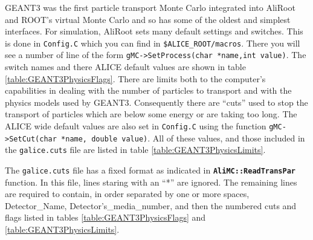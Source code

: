 GEANT3 was the first particle transport Monte Carlo integrated into
AliRoot and ROOT's virtual Monte Carlo and so has some of the
oldest and simplest interfaces. For simulation, AliRoot sets many
default settings and switches. This is done in \texttt{Config.C} which
you can find in \texttt{\$ALICE\_ROOT/macros}. There you will see a
number of line of the form \texttt{gMC->SetProcess(char *name,int value)}.
The switch names and there ALICE default values are shown in table
\ref{table:GEANT3PhysicsFlags}. There are limits both to the computer's
capabilities in dealing with the number of particles to transport and
with the physics models used by GEANT3. Consequently there are ``cuts''
used to stop the transport of particles which are below some energy
or are taking too long. The ALICE wide default values are also set
in \texttt{Config.C} using the function \texttt{gMC->SetCut(char *name,
double value)}. All of these values, and those included in the 
\texttt{galice.cuts} file are listed in table \ref{table:GEANT3PhysicsLimits}.

The \texttt{galice.cuts} file has a fixed format as indicated in
\texttt{\bf AliMC::ReadTransPar} function. In this file, lines
staring with an ``*'' are ignored. The remaining lines are required to
contain, in order separated by one or more spaces, Detector\_Name, 
Detector's\_media\_number, and then the numbered cuts and flags listed in
tables \ref{table:GEANT3PhysicsFlags} and \ref{table:GEANT3PhysicsLimits}.

